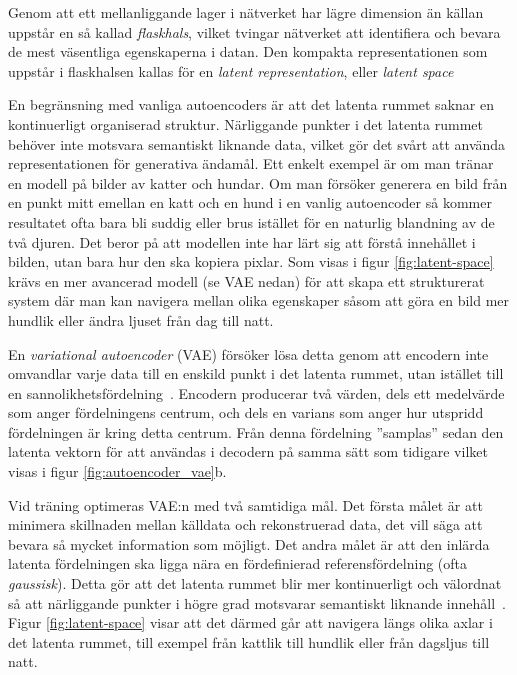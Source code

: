 Genom att ett mellanliggande lager i nätverket har lägre dimension än källan uppstår en så kallad \textit{flaskhals}, vilket tvingar nätverket att identifiera och bevara de mest väsentliga egenskaperna i datan. Den kompakta representationen som uppstår i flaskhalsen kallas för en \textit{latent representation}, eller \textit{latent space} \cite{kingma2013autoencoding}


En begränsning med vanliga autoencoders är att det latenta rummet saknar en kontinuerligt organiserad struktur. Närliggande punkter i det latenta rummet behöver inte motsvara semantiskt liknande data, vilket gör det svårt att använda representationen för generativa ändamål.
Ett enkelt exempel är om man tränar en modell på bilder av katter och hundar. Om man försöker generera en bild från en punkt mitt emellan en katt och en hund i en vanlig autoencoder så kommer resultatet ofta bara bli suddig eller brus istället för en naturlig blandning av de två djuren. Det beror på att modellen inte har lärt sig att förstå innehållet i bilden, utan bara hur den ska kopiera pixlar. Som visas i figur \ref{fig:latent-space} krävs en mer avancerad modell (se VAE nedan) för att skapa ett  strukturerat system där man kan navigera mellan olika egenskaper såsom att göra en bild mer hundlik eller ändra ljuset från dag till natt.

En \textit{variational autoencoder} (VAE) försöker lösa detta genom att encodern inte omvandlar varje data till en enskild punkt i det latenta rummet, utan istället till en sannolikhetsfördelning~\cite{kingma2013autoencoding}. Encodern producerar två värden, dels ett medelvärde som anger fördelningens centrum, och dels en varians som anger hur utspridd fördelningen är kring detta centrum. Från denna fördelning ''samplas'' sedan den latenta vektorn för att användas i decodern på samma sätt som tidigare vilket visas i figur \ref{fig:autoencoder_vae}b.


Vid träning optimeras VAE:n med två samtidiga mål. Det första målet är att minimera skillnaden mellan källdata och rekonstruerad data, det vill säga att bevara så mycket information som möjligt. Det andra målet är att den inlärda latenta fördelningen ska ligga nära en fördefinierad referensfördelning (ofta \textit{gaussisk}).  Detta gör att det latenta rummet blir mer kontinuerligt och välordnat så att närliggande punkter i högre grad motsvarar semantiskt liknande innehåll~\cite{kingma2013autoencoding}.  Figur \ref{fig:latent-space} visar att det därmed går att navigera längs olika axlar i det latenta rummet, till exempel från kattlik till hundlik eller från dagsljus till natt.


